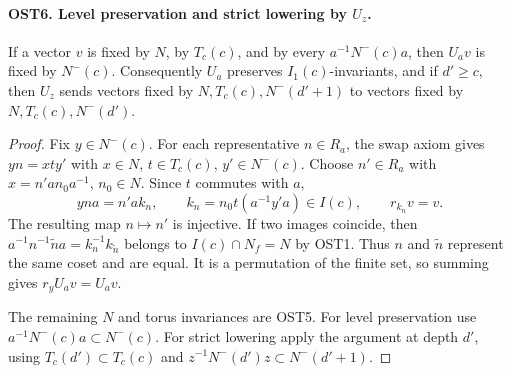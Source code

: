 \documentclass[11pt,a4paper]{article}
\numberwithin{equation}{section}
\theoremstyle{remark}\newtheorem{remark}[theorem]{Remark}
\begin{document}
\paragraph{OST6. Level preservation and strict lowering by $U_z$.}
\label{claim:OST6}
If a vector $v$ is fixed by $N$, by $T_c(c)$, and by every
$a^{-1}N^-(c)a$, then $U_av$ is fixed by $N^-(c)$.
Consequently $U_a$ preserves $I_1(c)$-invariants, and if
$d'\geq c$, then $U_z$ sends vectors fixed by
$N,\allowbreak{} T_c(c),\allowbreak{} N^-(d'+1)$ to vectors fixed by
$N,\allowbreak{} T_c(c),\allowbreak{} N^-(d')$.
\begin{proof}
Fix $y\in N^-(c)$.  For each representative $n\in R_a$,
the swap axiom gives $yn=x t y'$ with $x\in N$,
$t\in T_c(c)$, $y'\in N^-(c)$.  Choose $n'\in R_a$
with $x=n'a n_0a^{-1}$, $n_0\in N$.  Since $t$ commutes
with $a$,
\[
 yn a=n'a k_n,\qquad k_n=n_0t(a^{-1}y'a)\in I(c),
                       \qquad r_{k_n}v=v.
\]
The resulting map $n\mapsto n'$ is injective.  If two images
coincide, then
$a^{-1}n^{-1}\widetilde n a=k_n^{-1}k_{\widetilde n}$
belongs to $I(c)\cap N_f=N$ by OST1.  Thus $n$ and
$\widetilde n$ represent the same coset and are equal.
It is a permutation of the finite set, so summing gives
$r_yU_av=U_av$.

The remaining $N$ and torus invariances are OST5.
For level preservation use
$a^{-1}N^-(c)a\subset N^-(c)$.
For strict lowering apply the argument at depth $d'$,
using $T_c(d')\subset T_c(c)$ and
$z^{-1}N^-(d')z\subset N^-(d'+1)$.
\end{proof}

\end{document}
